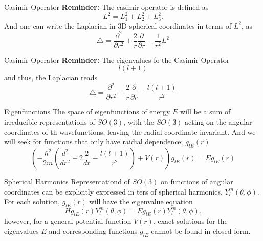 \documentclass[12pt]{beamer}
\begin{document}
\begin{frame}{Casimir Operator}
\textbf{Reminder: }The casimir operator is defined as 
\begin{displaymath}
  L^2 = L_1^2 + L_2^2 + L_3^2.
\end{displaymath}
And one can write the Laplacian in 3D spherical coordinates in terms of $L^2$, as
\begin{displaymath}
  \triangle = \frac{\partial^2}{\partial r^2} + \frac{2}{r}\frac{\partial}{\partial r} - \frac{1}{r^2}L^2
\end{displaymath}
\end{frame}

\begin{frame}{Casimir Operator}
\textbf{Reminder:} The eigenvalues fo the Casimir Operator 
\begin{displaymath}
  l(l+1)
\end{displaymath}
 and thus, the Laplacian reads
\begin{displaymath}
  \triangle = \frac{\partial^2}{\partial r^2} + \frac{2}{r}\frac{\partial}{\partial r} - \frac{l(l+1)}{r^2}
\end{displaymath}
\end{frame}

\begin{frame}{Eigenfunctions}
The space of eigenfunctions of energy $E$ will be a sum of irreducible representations of $SO(3)$, with the $SO(3)$ acting on the angular coordinates of th wavefunctions, leaving the radial coordinate invariant.
And we will seek for functions that only have raidial dependence; $g_{lE}(r)$
\begin{displaymath}
  \left(-\frac{\hbar^2}{2m} \left( \frac{d^2}{dr^2} +2\frac{2}{dr} - \frac{l(l+1)}{r^2} \right)+ V(r) \right)g_{lE}(r) = Eg_{lE}(r)
\end{displaymath}
\end{frame}

\begin{frame}{Spherical Harmonics}
Representationd of $SO(3)$ on functions of angular coordinates can be explicitly expressed in ters of spherical harmonics, $Y^{m}_{l}(\theta, \phi)$.
For each solution, $g_{lE}(r)$ will have the eigenvalue equation
\begin{displaymath}
  Hg_{lE}(r)Y^{m}_{l}(\theta, \phi) = Eg_{lE}(r)Y^{m}_{l}(\theta, \phi).
\end{displaymath}however, for a general potential function $V(r)$, exact solutions for the eigenvalues $E$ and corresponding functions $g_{lE}$ cannot be found in closed form.
\end{frame}
\end{document}
